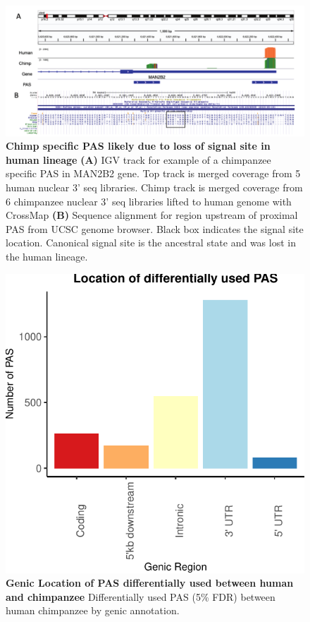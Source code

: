 \begin{figure}[!htb]
\centering
\includegraphics[width=5in]{img/ch03/Fig1_figSup9.pdf}
\caption[Chimp specific PAS likely due to loss of signal site in human lineage]{\textbf{Chimp specific PAS likely due to loss of signal site in human lineage} {\bf (A)} IGV track for example of a chimpanzee specific PAS in MAN2B2 gene. Top track is merged coverage from 5 human nuclear 3' seq libraries. Chimp track is merged coverage from 6 chimpanzee nuclear 3' seq libraries lifted to human genome with CrossMap\citep{zhao_crossmap_2014} {\bf (B)}  Sequence alignment for region upstream of proximal PAS from UCSC genome browser\citep{kent_human_2002}. Black box indicates the signal site location. Canonical signal site is the ancestral state and was lost in the human lineage.}
\label{fig:ch03-exChimpspec}
\end{figure}
\clearpage

\begin{figure}[!htb]
\centering
\includegraphics[width=5in]{img/ch03/Fig2-figSup1.pdf}
\caption[Genic Location of PAS differentially used between human and chimpanzee]{\textbf{Genic Location of PAS differentially used between human and chimpanzee} Differentially used PAS (5\% FDR) between human chimpanzee by genic annotation.}
\label{fig:ch03-dPAS}
\end{figure}
\clearpage

